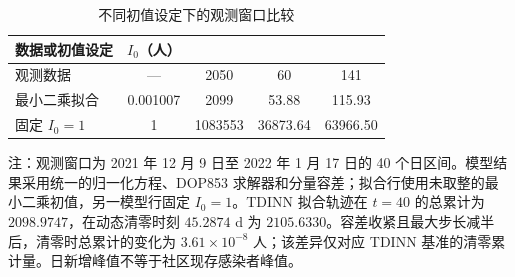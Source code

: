 \begin{table}[htbp]
\centering\small
\setlength{\tabcolsep}{3.5pt}
\renewcommand{\arraystretch}{1.25}
\begin{threeparttable}
\caption{不同初值设定下的观测窗口比较}
\label{tab:sup:initial}
\begin{tabular*}{\linewidth}{@{\extracolsep{\fill}}lS[table-format=1.6]S[table-format=7.0]S[table-format=5.2]S[table-format=5.2]@{}}
\toprule
数据或初值设定 & {$I_0$（人）} & {} & {} & {}\\
\midrule
观测数据 & {---} & 2050 & 60 & 141\\
最小二乘拟合 & 0.001007 & 2099 & 53.88 & 115.93\\
固定 $I_0=1$ & 1 & 1083553 & 36873.64 & 63966.50\\
\bottomrule
\end{tabular*}
\begin{tablenotes}[flushleft]\footnotesize
\item 注：观测窗口为 2021 年 12 月 9 日至 2022 年 1 月 17 日的 40 个日区间。模型结果采用统一的归一化方程、DOP853 求解器和分量容差；拟合行使用未取整的最小二乘初值，另一模型行固定 $I_0=1$。TDINN 拟合轨迹在 $t=40$ 的总累计为 $2098.9747$，在动态清零时刻 $45.2874$ d 为 $2105.6330$。容差收紧且最大步长减半后，清零时总累计的变化为 $3.61\times10^{-8}$ 人；该差异仅对应 TDINN 基准的清零累计量。日新增峰值不等于社区现存感染者峰值。
\end{tablenotes}
\end{threeparttable}
\end{table}
\clearpage
